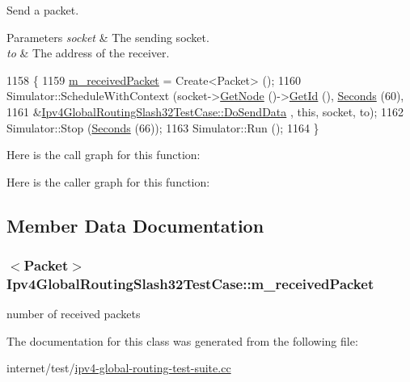 Send a packet. 


\begin{DoxyParams}{Parameters}
{\em socket} & The sending socket. \\
\hline
{\em to} & The address of the receiver. \\
\hline
\end{DoxyParams}

\begin{DoxyCode}
1158 \{
1159   \hyperlink{classIpv4GlobalRoutingSlash32TestCase_ae7e73a96ac4929007add694e0c1fba8b}{m\_receivedPacket} = Create<Packet> ();
1160   Simulator::ScheduleWithContext (socket->\hyperlink{classns3_1_1Socket_aba642ad4301c1df47befc0aa9afa2e48}{GetNode} ()->\hyperlink{classns3_1_1Node_aaf49b64a843565ce3812326313b370ac}{GetId} (), 
      \hyperlink{group__timecivil_ga33c34b816f8ff6628e33d5c8e9713b9e}{Seconds} (60),
1161                                   &\hyperlink{classIpv4GlobalRoutingSlash32TestCase_ae2fe792c3efae6607084555c2b55fdb3}{Ipv4GlobalRoutingSlash32TestCase::DoSendData}
      , \textcolor{keyword}{this}, socket, to);
1162   Simulator::Stop (\hyperlink{group__timecivil_ga33c34b816f8ff6628e33d5c8e9713b9e}{Seconds} (66));
1163   Simulator::Run ();
1164 \}
\end{DoxyCode}


Here is the call graph for this function\+:




Here is the caller graph for this function\+:




\subsection{Member Data Documentation}
\subsubsection[{\texorpdfstring{m\+\_\+received\+Packet}{m_receivedPacket}}]{$<${\bf Packet}$>$ Ipv4\+Global\+Routing\+Slash32\+Test\+Case\+::m\+\_\+received\+Packet}\hypertarget{classIpv4GlobalRoutingSlash32TestCase_ae7e73a96ac4929007add694e0c1fba8b}{}\label{classIpv4GlobalRoutingSlash32TestCase_ae7e73a96ac4929007add694e0c1fba8b}


number of received packets 



The documentation for this class was generated from the following file\+:\begin{DoxyCompactItemize}
\item 
internet/test/\hyperlink{ipv4-global-routing-test-suite_8cc}{ipv4-\/global-\/routing-\/test-\/suite.\+cc}\end{DoxyCompactItemize}
